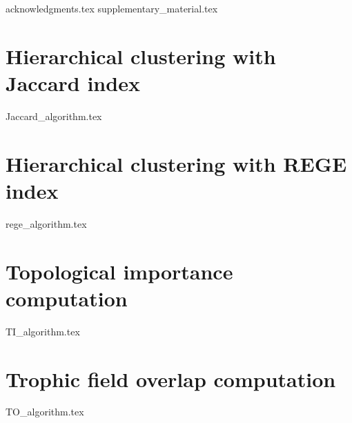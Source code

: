 \documentclass[onecolumn]{article} %
\begin{document}
{acknowledgments.tex}
{supplementary_material.tex}


\onecolumn
\begin{appendices}
	\section{Hierarchical clustering with Jaccard index} \label{appendix:jaccard}
	{Jaccard_algorithm.tex}
	\section{Hierarchical clustering with REGE index} \label{appendix:rege}
	{rege_algorithm.tex}
	\section{Topological importance computation} \label{appendix:TI}
	{TI_algorithm.tex}
	\section{Trophic field overlap computation} \label{appendix:TO}
	{TO_algorithm.tex}
\end{appendices}
\end{document}
